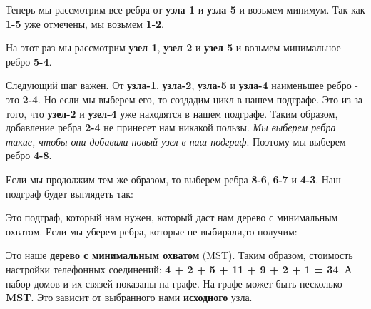 
\begin{center}
\end{center}

Теперь мы рассмотрим все ребра от \textbf{узла 1} и \textbf{узла 5} и возьмем минимум. Так как \textbf{1-5} уже отмечены, мы возьмем \textbf{1-2}.

\newpage

\begin{center}
\end{center}

На этот раз мы рассмотрим \textbf{узел 1}, \textbf{узел 2} и \textbf{узел 5} и возьмем минимальное ребро \textbf{5-4}.

\begin{center}
\end{center}

Следующий шаг важен. От \textbf{узла-1}, \textbf{узла-2}, \textbf{узла-5} и \textbf{узла-4} наименьшее ребро - это \textbf{2-4}. Но если мы выберем его, то создадим цикл в нашем подграфе. Это из-за того, что \textbf{узел-2} и \textbf{узел-4} уже находятся в нашем подграфе. Таким образом, добавление ребра \textbf{2-4} не принесет нам никакой пользы. \textit{Мы выберем ребра такие, чтобы они добавили новый узел в наш подграф}. Поэтому мы выберем ребро \textbf{4-8}.

\begin{center}
\end{center}

Если мы продолжим тем же образом, то выберем ребра \textbf{8-6}, \textbf{6-7} и \textbf{4-3}. Наш подграф будет выглядеть так:

\begin{center}
\end{center}

Это подграф, который нам нужен, который даст нам дерево с минимальным охватом. Если мы уберем ребра, которые не выбирали,то получим:

\begin{center}
\end{center}

Это наше \textbf{дерево с минимальным охватом} (MST). Таким образом, стоимость настройки телефонных соединений: \textbf{4 + 2 + 5 + 11 + 9 + 2 + 1 = 34}. А набор домов и их связей показаны на графе. На графе может быть несколько \textbf{MST}. Это зависит от выбранного нами \textbf{исходного} узла.

